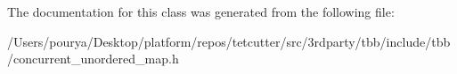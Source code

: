 The documentation for this class was generated from the following file\+:\begin{DoxyCompactItemize}
\item 
/\+Users/pourya/\+Desktop/platform/repos/tetcutter/src/3rdparty/tbb/include/tbb/concurrent\+\_\+unordered\+\_\+map.\+h\end{DoxyCompactItemize}
